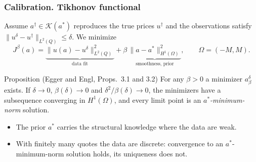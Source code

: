 \begin{frame}
\frametitle{Calibration. Tikhonov functional}
\begin{scriptsize}
Assume $a^\dagger \in \mathcal{K}(a^*)$ reproduces the true prices $u^\dagger$
and the observations satisfy $\|u^\delta - u^\dagger\|_{L^2(Q)} \le \delta$. We minimize
\begin{equation*}
    J^\beta(a) = \underbrace{\|u(a) - u^\delta\|^2_{L^2(Q)}}_{\text{data fit}}
    + \beta\,\underbrace{\|a - a^*\|^2_{H^1(\Omega)}}_{\text{smoothness, prior}},
    \qquad \Omega = (-M, M).
\end{equation*}

\begin{block}{Proposition (Egger and Engl, Props.~3.1 and 3.2)}
For any $\beta > 0$ a minimizer $a^\delta_\beta$ exists.
If $\delta \to 0$, $\beta(\delta) \to 0$ and $\delta^2/\beta(\delta) \to 0$,
the minimizers have a subsequence converging in $H^1(\Omega)$,
and every limit point is an \emph{$a^*$-minimum-norm} solution.
\end{block}

\begin{itemize}
\item The prior $a^*$ carries the structural knowledge where the data are weak.
\item With finitely many quotes the data are discrete:
convergence to an $a^*$-minimum-norm solution holds, its uniqueness does not.
\end{itemize}
\end{scriptsize}
\end{frame}

